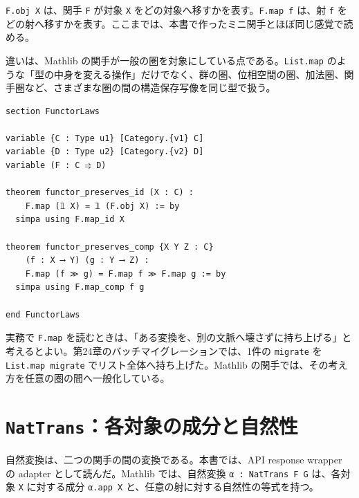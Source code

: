 \texttt{F.obj X} は、関手 \texttt{F} が対象 \texttt{X} をどの対象へ移すかを表す。\texttt{F.map f} は、射 \texttt{f} をどの射へ移すかを表す。ここまでは、本書で作ったミニ関手とほぼ同じ感覚で読める。

違いは、Mathlib の関手が一般の圏を対象にしている点である。\texttt{List.map} のような「型の中身を変える操作」だけでなく、群の圏、位相空間の圏、加法圏、関手圏など、さまざまな圏の間の構造保存写像を同じ型で扱う。

\begin{listing}[htbp]
\begin{verbatim}
section FunctorLaws

variable {C : Type u1} [Category.{v1} C]
variable {D : Type u2} [Category.{v2} D]
variable (F : C ⥤ D)

theorem functor_preserves_id (X : C) :
    F.map (𝟙 X) = 𝟙 (F.obj X) := by
  simpa using F.map_id X

theorem functor_preserves_comp {X Y Z : C}
    (f : X ⟶ Y) (g : Y ⟶ Z) :
    F.map (f ≫ g) = F.map f ≫ F.map g := by
  simpa using F.map_comp f g

end FunctorLaws
\end{verbatim}
\caption{関手が恒等射と合成を保存することを使う}
\label{lst:ch34_functor_laws}
\end{listing}

\begin{softwarebox}
実務で \texttt{F.map} を読むときは、「ある変換を、別の文脈へ壊さずに持ち上げる」と考えるとよい。第24章のバッチマイグレーションでは、1件の \texttt{migrate} を \texttt{List.map migrate} でリスト全体へ持ち上げた。Mathlib の関手では、その考え方を任意の圏の間へ一般化している。
\end{softwarebox}

\section{\texttt{NatTrans}：各対象の成分と自然性}

自然変換は、二つの関手の間の変換である。本書では、API response wrapper の adapter として読んだ。Mathlib では、自然変換 \texttt{α : NatTrans F G} は、各対象 \texttt{X} に対する成分 \texttt{α.app X} と、任意の射に対する自然性の等式を持つ。

